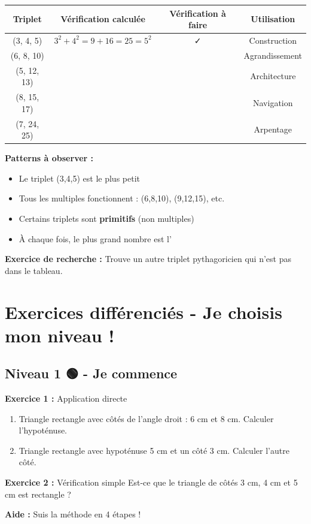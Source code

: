 \begin{center}
	\begin{tabular}{|c|c|c|c|}
		\hline
		\textbf{Triplet} & \textbf{Vérification calculée} & \textbf{Vérification à faire} & \textbf{Utilisation} \\
		\hline
		(3, 4, 5) & $3^2 + 4^2 = 9 + 16 = 25 = 5^2$ & ✓ & Construction \\
		\hline
		(6, 8, 10) & \dotfill & \dotfill & Agrandissement \\
		\hline
		(5, 12, 13) & \dotfill & \dotfill & Architecture \\
		\hline
		(8, 15, 17) & \dotfill & \dotfill & Navigation \\
		\hline
		(7, 24, 25) & \dotfill & \dotfill & Arpentage \\
		\hline
	\end{tabular}
\end{center}

\begin{remarkbox}
	\textbf{Patterns à observer :}
	\begin{itemize}
		\item Le triplet (3,4,5) est le plus petit
		\item Tous les multiples fonctionnent : (6,8,10), (9,12,15), etc.
		\item Certains triplets sont \textbf{primitifs} (non multiples)
		\item À chaque fois, le plus grand nombre est l'\dotfill
	\end{itemize}
	
	\textbf{Exercice de recherche :} Trouve un autre triplet pythagoricien qui n'est pas dans le tableau.
\end{remarkbox}

\section{Exercices différenciés - Je choisis mon niveau !}

\subsection{Niveau 1 🟢 - Je commence}

\begin{exercisebox}
	\textbf{Exercice 1 :} Application directe
	\begin{enumerate}[label=\alph*)]
		\item Triangle rectangle avec côtés de l'angle droit : 6 cm et 8 cm. 
		Calculer l'hypoténuse.
		
		\vspace{1cm}
		\item Triangle rectangle avec hypoténuse 5 cm et un côté 3 cm. 
		Calculer l'autre côté.
	\end{enumerate}
	
	\textbf{Exercice 2 :} Vérification simple
	Est-ce que le triangle de côtés 3 cm, 4 cm et 5 cm est rectangle ?
	
	\textbf{Aide :} Suis la méthode en 4 étapes !
\end{exercisebox}

